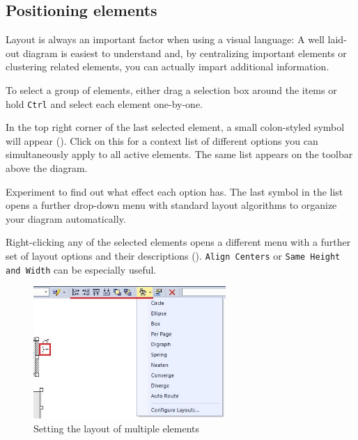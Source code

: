 \subsection{Positioning elements}

Layout is always an important factor when using a visual language:
A well laid-out diagram is easiest to understand and, by centralizing important
elements or clustering related elements, you can actually impart additional information.

\begin{stepbystep}
\item To select a group of elements, either drag a selection box around the items or hold \texttt{Ctrl} and select each element
one-by-one.

\item In the top right corner of the last selected element, a small colon-styled symbol will appear (). Click on
this for a context list of different options you can simultaneously apply to all active elements. The same list appears on the toolbar above the
diagram. 

\item Experiment to find out what effect each option has. The last symbol in the list opens a further drop-down menu with standard layout
algorithms to organize your diagram automatically.

\item Right-clicking any of the selected elements opens a different menu with a further set of layout options and their descriptions
(). \texttt{Align Centers} or \texttt{Same Height and Width} can be especially useful.

\begin{figure}[htbp]
\begin{center} 
  \includegraphics[width=0.65\textwidth]{../../org.moflon.doc.handbook.05_miscellaneous/1_grokkingEA/01_layOutElements/ea_layoutElementsCommonContext}
  \caption{Setting the layout of multiple elements}  
  \label{ea:layout1}
\end{center}
\end{figure}


\end{stepbystep}
